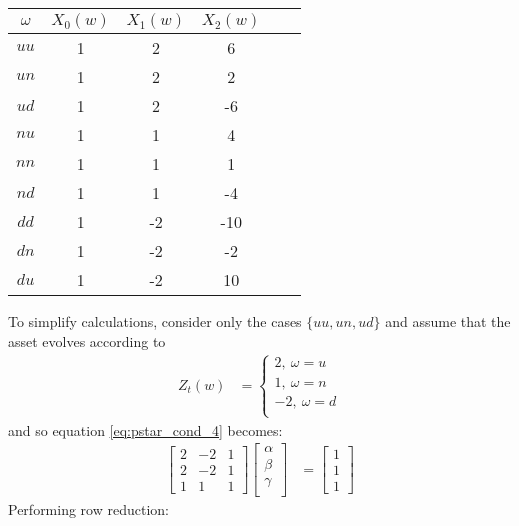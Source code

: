 \documentclass{article}
\begin{document}
\begin{center}
\begin{tabular}{|c|c|c|c|c|c|}
\hline
$\omega$ & $X_0(w)$ & $X_1(w)$ & $X_2(w)$ \\
\hline
\hline
$uu$ & 1 & 2 & 6 \\\hline
$un$ & 1 & 2 & 2 \\\hline
$ud$ & 1 & 2 & -6 \\\hline
$nu$ & 1 & 1 & 4 \\\hline
$nn$ & 1 & 1 & 1 \\\hline
$nd$ & 1 & 1 & -4 \\\hline
$dd$ & 1 & -2 & -10 \\\hline
$dn$ & 1 & -2 & -2 \\\hline
$du$ & 1 & -2 & 10 \\\hline
\end{tabular}
\end{center}
To simplify calculations, consider only the cases $\{uu,un,ud\}$ and assume that the asset evolves according to 
\begin{align*}
Z_t(w) &= \begin{cases}
    2, \medspace \omega=u \\
    1, \medspace \omega=n \\
    -2, \medspace \omega=d \\
\end{cases}
\end{align*}
and so equation \ref{eq:pstar_cond_4} becomes:
\begin{align}
\left[\begin{array}{cccc}
2 & -2 & 1\\
2 & -2 & 1\\
1 & 1 & 1
\end{array} \right]
\left[\begin{array}{c}
\alpha\\
\beta\\
\gamma\\
\end{array} \right] &= \left[\begin{array}{c}
1\\
1\\
1
\end{array} \right]
\end{align}
Performing row reduction:
\end{document}
